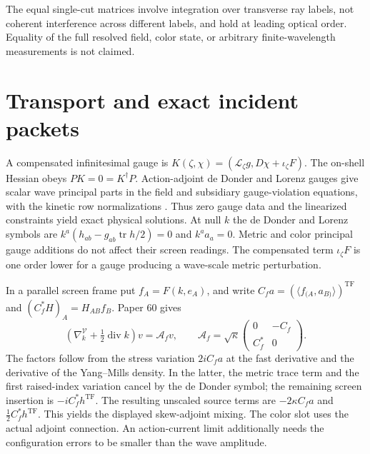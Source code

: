 \documentclass[11pt]{article}
\newcommand{\tr}{\operatorname{tr}}
\newcommand{\Div}{\operatorname{div}}
\newcommand{\TF}{\mathrm{TF}}
\begin{document}
The equal single-cut matrices involve integration over
transverse ray labels, not coherent interference across
different labels, and hold at leading optical order. Equality
of the full resolved field, color state, or arbitrary
finite-wavelength measurements is not claimed.

\section{Transport and exact incident packets}\label{sec:prep}
A compensated infinitesimal gauge is
\(K(\zeta,\chi)=(\mathcal L_\zeta g,D\chi+\iota_\zeta F)\).
The on-shell Hessian obeys \(PK=0=K^\dagger P\).
Action-adjoint de Donder and Lorenz gauges give scalar wave
principal parts in the field and subsidiary gauge-violation
equations, with the kinetic row normalizations
\cite{hack,p60}. Thus zero gauge data and the linearized
constraints yield exact physical solutions. At null \(k\)
the de Donder and Lorenz symbols are
\(k^a(h_{ab}-g_{ab}\tr h/2)=0\) and \(k^a a_a=0\).
Metric and color principal gauge additions do not affect their
screen readings. The compensated term \(\iota_\zeta F\) is
one order lower for a gauge producing a wave-scale metric
perturbation.

In a parallel screen frame put \(f_A=F(k,e_A)\), and write
\(C_f a=(\langle f_{(A},a_{B)}\rangle)^\TF\) and
\((C_f^*H)_A=H_{AB}f_B\). Paper 60 gives
\begin{equation}\label{eq:transport}
  (\nabla_k^{\mathcal V}+\tfrac12\Div k)v
   =\mathcal A_fv,\qquad
  \mathcal A_f=\sqrt\kappa
       \begin{pmatrix}0&-C_f\\ C_f^*&0\end{pmatrix}.
\end{equation}
The factors follow from the stress variation \(2iC_fa\)
at the fast derivative and the derivative of the Yang--Mills
density. In the latter, the metric trace term and the first
raised-index variation cancel by the de Donder symbol;
the remaining screen insertion is \(-i C_f^*h^\TF\).
The resulting unscaled source terms are
\(-2\kappa C_fa\) and \(\tfrac12 C_f^*h^\TF\).
This yields the displayed skew-adjoint mixing.
The color slot uses the actual adjoint connection.
An action-current limit additionally needs the configuration
errors to be smaller than the wave amplitude.
\end{document}
